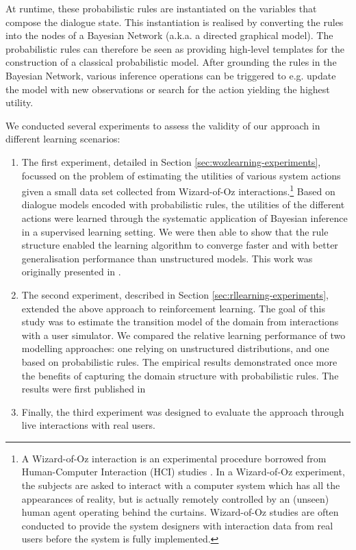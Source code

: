 At runtime, these probabilistic rules are instantiated on the variables that compose the dialogue state.  This instantiation is realised by converting the rules into the nodes of a Bayesian Network (a.k.a. a directed graphical model).  The probabilistic rules can therefore be seen as providing high-level templates for the construction of a classical probabilistic model.  After grounding the rules in the Bayesian Network, various inference operations can be triggered to e.g. update the model with new observations or search for the action yielding the highest utility.  

We conducted several experiments to assess the validity of our approach in different learning scenarios: \begin{enumerate}
\item The first experiment, detailed in Section \ref{sec:wozlearning-experiments}, focussed on the problem of estimating the utilities of various system actions given a small data set collected from Wizard-of-Oz interactions.\footnote{A Wizard-of-Oz interaction is an experimental procedure borrowed from Human-Computer Interaction (HCI) studies \citep{woz93}. In a Wizard-of-Oz experiment, the subjects are asked to interact with a computer system which has all the appearances of reality, but is actually remotely controlled by an (unseen) human agent operating behind the curtains.  Wizard-of-Oz studies are often conducted to provide the system designers with interaction data from real users before the system is fully implemented.}  Based on dialogue models encoded with probabilistic rules, the utilities of the different actions were learned through the systematic application of Bayesian inference in a supervised learning setting.  We were then able to show that the rule structure enabled the learning algorithm to converge faster and with better generalisation performance than unstructured models. This work was originally presented in \citep{rulebasedmodels-sigdial2012}.
\item The second experiment, described in Section \ref{sec:rllearning-experiments}, extended the above approach to reinforcement learning. The goal of this study was to estimate the transition model of the domain from interactions with a user simulator. We compared the relative learning performance of two modelling approaches: one relying on unstructured distributions, and one based on probabilistic rules. The empirical results demonstrated once more the benefits of capturing the domain structure with probabilistic rules. The results were first published in  
\item Finally, the third experiment was designed to evaluate the approach through live interactions with real users.   
\end{enumerate}

